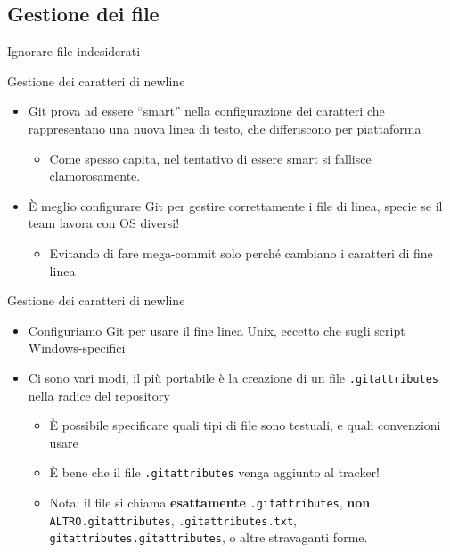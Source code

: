 \documentclass[xcolor=dvipsnames,presentation]{beamer}
\begin{document}
\subsection{Gestione dei file}

\begin{frame}{Ignorare file indesiderati}
    \begin{block}{Gestione dei caratteri di newline}
        \begin{itemize}
            \item Git prova ad essere ``smart'' nella configurazione dei caratteri che rappresentano una nuova linea di testo, che differiscono per piattaforma
            \begin{itemize}
                \item Come spesso capita, nel tentativo di essere smart si fallisce clamorosamente.
            \end{itemize}
            \item È meglio configurare Git per gestire correttamente i file di linea, specie se il team lavora con OS diversi!
            \begin{itemize}
                \item Evitando di fare mega-commit solo perché cambiano i caratteri di fine linea
            \end{itemize}
        \end{itemize}
    \end{block}
    \begin{block}{Gestione dei caratteri di newline}
        \begin{itemize}
            \item Configuriamo Git per usare il fine linea Unix, eccetto che sugli script Windows-specifici
            \item Ci sono vari modi, il più portabile è la creazione di un file \texttt{.gitattributes} nella radice del repository
            \begin{itemize}
                \item È possibile specificare quali tipi di file sono testuali, e quali convenzioni usare
                \item È bene che il file \texttt{.gitattributes} venga aggiunto al tracker!
                \item Nota: il file si chiama \textbf{esattamente} \texttt{.gitattributes},
                \textbf{non} \texttt{ALTRO.gitattributes}, \texttt{.gitattributes.txt}, \texttt{gitattributes.gitattributes}, o altre stravaganti forme.

\end{itemize}
\end{itemize}
\end{block}
\end{frame}
\end{document}
